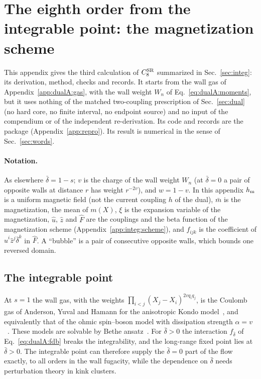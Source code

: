 \documentclass[11pt,a4paper]{article}
\numberwithin{equation}{section}
\newcommand{\CSR}{C^{\rm SR}}
\newcommand{\db}{\bar\delta}
\newcommand{\file}[1]{\path{#1}}
\begin{document}
\section{The eighth order from the integrable point: the magnetization scheme}\label{app:integ}
This appendix gives the third calculation of $\CSR_8$ summarized in Sec.~\ref{sec:integ}: its derivation, method,
checks and records. It starts from the wall gas of Appendix~\ref{app:dualA:gas}, with the wall weight $W_n$ of
Eq.~\eqref{eq:dualA:moments}, but it uses nothing of the matched two-coupling prescription of Sec.~\ref{sec:dual} (no
hard core, no finite interval, no endpoint source) and no input of the compendium or of the independent
re-derivation. Its code and records are the package \file{code/integ_d1/} (Appendix~\ref{app:repro}). Its result is
numerical in the sense of Sec.~\ref{sec:words}.

\paragraph{Notation.} As elsewhere $\db=1-s$; $v$ is the charge of the wall weight $W_n$ (at $\db=0$ a pair of
opposite walls at distance $r$ has weight $r^{-2v}$), and $w=1-v$. In this appendix $h_{\rm m}$ is a uniform magnetic
field (not the current coupling $h$ of the dual), $\bar m$ is the magnetization, the mean of $m(X)$, $\xi$ is the
expansion variable of the magnetization, $\hat u$, $\hat z$ and $\hat F$ are the couplings and the beta function of
the magnetization scheme (Appendix~\ref{app:integ:scheme}), and $f_{ijk}$ is the coefficient of $\hat u^i\hat
z^j\db^k$ in $\hat F$. A ``bubble'' is a pair of consecutive opposite walls, which bounds one reversed domain.

\subsection{The integrable point}\label{app:integ:point}
At $s=1$ the wall gas, with the weights $\prod_{i<j}(X_j-X_i)^{2vq_iq_j}$, is the Coulomb gas of Anderson, Yuval and
Hamann for the anisotropic Kondo model~\cite{Anderson:1969xx,Anderson:1970kyb}, and equivalently that of the ohmic
spin--boson model with dissipation strength $\alpha=v$~\cite{Leggett:1987zz}. These models are solvable by Bethe
ansatz~\cite{Andrei:1983,Tsvelick:1983}. For $\db>0$ the interaction $f_{\db}$ of Eq.~\eqref{eq:dualA:fdb} breaks the
integrability, and the long-range fixed point lies at $\db>0$. The integrable point can therefore supply the $\db=0$
part of the flow exactly, to all orders in the wall fugacity, while the dependence on $\db$ needs perturbation theory
in kink clusters.
\end{document}
